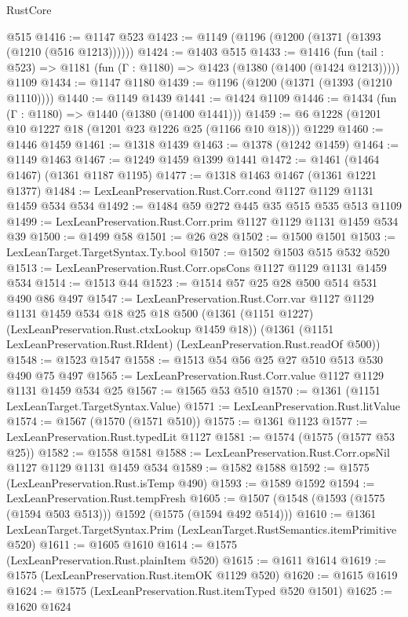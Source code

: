 \begin{lexlean}{RustCore}
\begin{coremodule}
    @515
@1416 := @1147 @523
@1423 := @1149 (@1196 (@1200 (@1371 (@1393 (@1210 (@516 @1213))))))
@1424 := @1403 @515
@1433 := @1416
    (fun (tail : @523) => @1181 (fun (Γ : @1180) => @1423 (@1380 (@1400 (@1424 @1213)))))
    @1109
@1434 := @1147 @1180
@1439 := @1196 (@1200 (@1371 (@1393 (@1210 @1110))))
@1440 := @1149 @1439
@1441 := @1424 @1109
@1446 := @1434 (fun (Γ : @1180) => @1440 (@1380 (@1400 @1441)))
@1459 := @6 @1228 (@1201 @10 @1227 @18 (@1201 @23 @1226 @25 (@1166 @10 @18))) @1229
@1460 := @1446 @1459
@1461 := @1318 @1439
@1463 := @1378 (@1242 @1459)
@1464 := @1149 @1463
@1467 := @1249 @1459 @1399 @1441
@1472 := @1461 (@1464 @1467) (@1361 @1187 @1195)
@1477 := @1318 @1463 @1467 (@1361 @1221 @1377)
@1484 := LexLeanPreservation.Rust.Corr.cond @1127 @1129 @1131 @1459 @534 @534
@1492 := @1484 @59 @272 @445 @35 @515 @535 @513 @1109
@1499 := LexLeanPreservation.Rust.Corr.prim @1127 @1129 @1131 @1459 @534 @39
@1500 := @1499 @58
@1501 := @26 @28
@1502 := @1500 @1501
@1503 := LexLeanTarget.TargetSyntax.Ty.bool
@1507 := @1502 @1503 @515 @532 @520
@1513 := LexLeanPreservation.Rust.Corr.opsCons @1127 @1129 @1131 @1459 @534
@1514 := @1513 @44
@1523 := @1514 @57 @25 @28 @500 @514 @531 @490 @86 @497
@1547 := LexLeanPreservation.Rust.Corr.var
    @1127
    @1129
    @1131
    @1459
    @534
    @18
    @25
    @18
    @500
    (@1361 (@1151 @1227) (LexLeanPreservation.Rust.ctxLookup @1459 @18))
    (@1361 (@1151 LexLeanPreservation.Rust.RIdent) (LexLeanPreservation.Rust.readOf @500))
@1548 := @1523 @1547
@1558 := @1513 @54 @56 @25 @27 @510 @513 @530 @490 @75 @497
@1565 := LexLeanPreservation.Rust.Corr.value @1127 @1129 @1131 @1459 @534 @25
@1567 := @1565 @53 @510
@1570 := @1361 (@1151 LexLeanTarget.TargetSyntax.Value)
@1571 := LexLeanPreservation.Rust.litValue
@1574 := @1567 (@1570 (@1571 @510))
@1575 := @1361 @1123
@1577 := LexLeanPreservation.Rust.typedLit @1127
@1581 := @1574 (@1575 (@1577 @53 @25))
@1582 := @1558 @1581
@1588 := LexLeanPreservation.Rust.Corr.opsNil @1127 @1129 @1131 @1459 @534
@1589 := @1582 @1588
@1592 := @1575 (LexLeanPreservation.Rust.isTemp @490)
@1593 := @1589 @1592
@1594 := LexLeanPreservation.Rust.tempFresh
@1605 := @1507 (@1548 (@1593 (@1575 (@1594 @503 @513))) @1592 (@1575 (@1594 @492 @514)))
@1610 := @1361 LexLeanTarget.TargetSyntax.Prim (LexLeanTarget.RustSemantics.itemPrimitive @520)
@1611 := @1605 @1610
@1614 := @1575 (LexLeanPreservation.Rust.plainItem @520)
@1615 := @1611 @1614
@1619 := @1575 (LexLeanPreservation.Rust.itemOK @1129 @520)
@1620 := @1615 @1619
@1624 := @1575 (LexLeanPreservation.Rust.itemTyped @520 @1501)
@1625 := @1620 @1624

\end{coremodule}
\end{lexlean}

